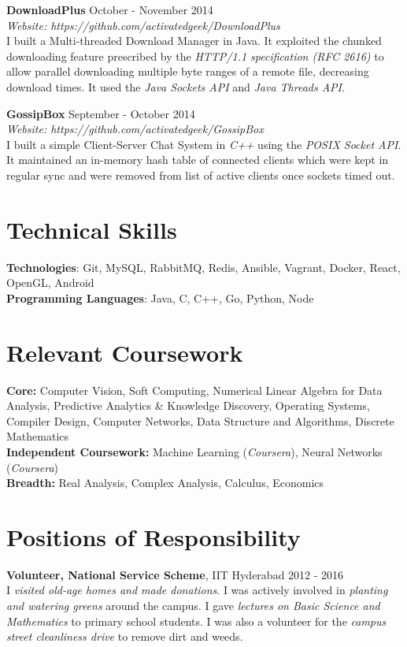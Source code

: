 \documentclass[margin,line]{res}
\begin{document}
\begin{resume}
  \vspace*{-2mm}
  {\bf DownloadPlus} \hfill October - November 2014 \\
  	{\it Website: https://github.com/activatedgeek/DownloadPlus} \\
  	I built a Multi-threaded Download Manager in Java. It exploited the chunked downloading feature prescribed by the {\it HTTP/1.1 specification (RFC 2616)} to allow parallel downloading multiple byte ranges of a remote file, decreasing download times. It used the {\it Java Sockets API} and {\it Java Threads API}.

  \vspace*{-2mm}
  {\bf GossipBox} \hfill September - October 2014 \\
    {\it Website: https://github.com/activatedgeek/GossipBox} \\
    I built a simple Client-Server Chat System in {\it C++} using the {\it POSIX Socket API}. It maintained an in-memory hash table of connected clients which were kept in regular sync and were removed from list of active clients once sockets timed out.

\section{\sc Technical Skills}
  {\bf Technologies}: Git, MySQL, RabbitMQ, Redis, Ansible, Vagrant, Docker, React, OpenGL, Android \\
  {\bf Programming Languages}: Java, C, C++, Go, Python, Node

\section{\sc Relevant Coursework}
  {\bf Core:} Computer Vision, Soft Computing, Numerical Linear Algebra for Data Analysis, Predictive Analytics \& Knowledge Discovery, Operating Systems, Compiler Design, Computer Networks, Data Structure and Algorithms, Discrete Mathematics \\
  {\bf Independent Coursework:} Machine Learning ({\it Coursera}), Neural Networks ({\it Coursera}) \\
  {\bf Breadth:} Real Analysis, Complex Analysis, Calculus, Economics \\

\section{\sc Positions of Responsibility}
  {\bf Volunteer, National Service Scheme}, IIT Hyderabad \hfill 2012 - 2016 \\
    I {\it visited old-age homes and made donations}. I was actively involved in {\it planting and watering greens} around the campus. I gave {\it lectures on Basic Science and Mathematics} to primary school students. I was also a volunteer for the {\it campus street cleanliness drive} to remove dirt and weeds.


\end{resume}
\end{document}
